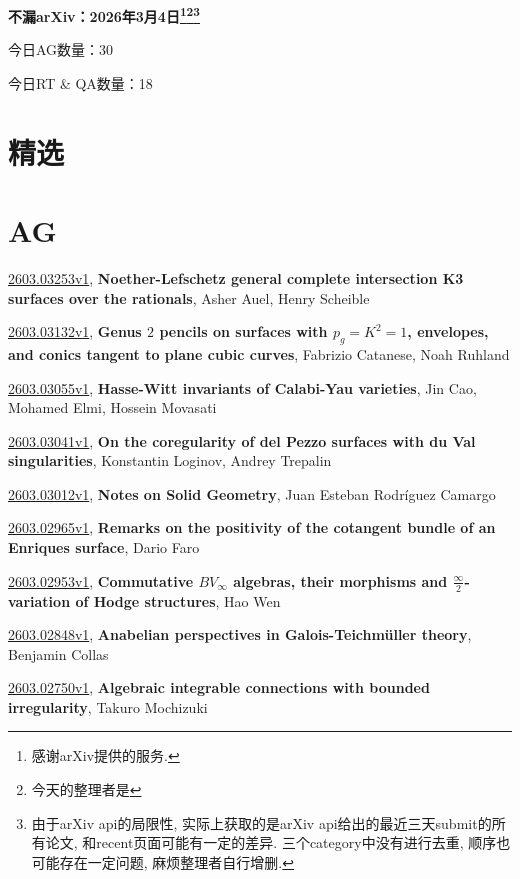 \documentclass[9pt, a4paper]{article}
\theoremstyle{plain}
\theoremstyle{definition}
\theoremstyle{remark}
\newcommand{\arxiv}[3]{\href{https://arxiv.org/abs/#1}{#1}, \textbf{\textcolor{arxivblue}{#2}}, #3}
\newcommand{\AGnumber}{30}
\newcommand{\RTQAnumber}{18}
\newcommand{\NewestDate}{2026年3月4日}
\newcommand{\todayarXiver}{} %
\begin{document}
\begin{center}
    \Huge\textbf{不漏arXiv：\NewestDate\footnote{感谢arXiv提供的服务.}\footnote{今天的整理者是\todayarXiver}\footnote{由于arXiv api的局限性, 实际上获取的是arXiv api给出的最近三天submit的所有论文, 和recent页面可能有一定的差异. 三个category中没有进行去重, 顺序也可能存在一定问题, 麻烦整理者自行增删.}} \\
\end{center}

\setcounter{section}{-1}

\begin{center}
    今日AG数量：\AGnumber
    
    今日RT \& QA数量：\RTQAnumber
    
\end{center}


\section{精选}


\section{AG}
\arxiv{2603.03253v1}{Noether-Lefschetz general complete intersection K3 surfaces over the rationals}{Asher Auel, Henry Scheible}

\arxiv{2603.03132v1}{Genus $2$ pencils on surfaces with $p_g=K^2=1$, envelopes, and conics tangent to plane cubic curves}{Fabrizio Catanese, Noah Ruhland}

\arxiv{2603.03055v1}{Hasse-Witt invariants of Calabi-Yau varieties}{Jin Cao, Mohamed Elmi, Hossein Movasati}

\arxiv{2603.03041v1}{On the coregularity of del Pezzo surfaces with du Val singularities}{Konstantin Loginov, Andrey Trepalin}

\arxiv{2603.03012v1}{Notes on Solid Geometry}{Juan Esteban Rodríguez Camargo}

\arxiv{2603.02965v1}{Remarks on the positivity of the cotangent bundle of an Enriques surface}{Dario Faro}

\arxiv{2603.02953v1}{Commutative $BV_\infty$ algebras, their morphisms and $\frac{\infty}{2}$-variation of Hodge structures}{Hao Wen}

\arxiv{2603.02848v1}{Anabelian perspectives in Galois-Teichmüller theory}{Benjamin Collas}

\arxiv{2603.02750v1}{Algebraic integrable connections with bounded irregularity}{Takuro Mochizuki}
\end{document}
